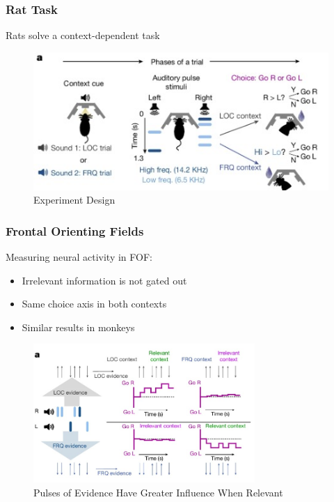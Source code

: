 \documentclass{beamer}
\begin{document}
\begin{frame}
\frametitle{Rat Task}

Rats solve a context-dependent task
\begin{figure}[h!]
   	\centering
   	\includegraphics[width=\textwidth]{design.jpg}
   	\caption{Experiment Design}
   	\label{fig:design}
\end{figure}
\end{frame}

\begin{frame}
\frametitle{Frontal Orienting Fields}
Measuring neural activity in FOF:

\begin{itemize}
	\item Irrelevant information is not gated out
	\item Same choice axis in both contexts
	\item Similar results in monkeys
\end{itemize}

\begin{figure}[h!]
	\centering
	\includegraphics[width=0.75\textwidth]{impact.jpg}
	\caption{Pulses of Evidence Have Greater Influence When Relevant}
    \label{fig:impact}
\end{figure}
\end{frame}
\end{document}
